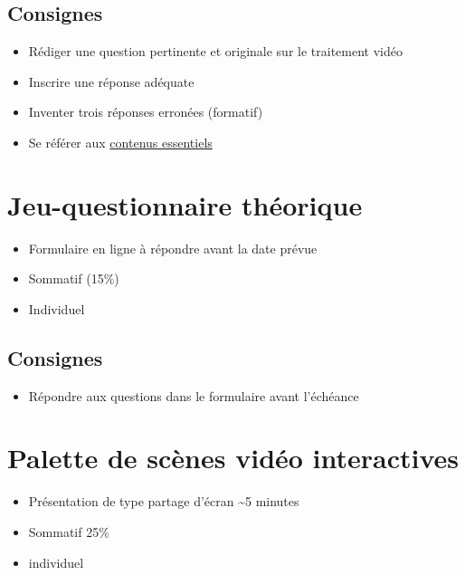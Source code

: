 \documentclass[
  french,
]{book}
\providecommand{\tightlist}{%
  \setlength{\itemsep}{0pt}\setlength{\parskip}{0pt}}
\begin{document}
\hypertarget{consignes-1}{%
\subsection{Consignes}\label{consignes-1}}

\begin{itemize}
\tightlist
\item
  Rédiger une question pertinente et originale sur le traitement vidéo
\item
  Inscrire une réponse adéquate
\item
  Inventer trois réponses erronées (formatif)
\item
  Se référer aux \href{}{contenus essentiels}
\end{itemize}

\hypertarget{sommatif_3}{%
\section{Jeu-questionnaire théorique}\label{sommatif_3}}

\begin{itemize}
\tightlist
\item
  Formulaire en ligne à répondre avant la date prévue
\item
  Sommatif (15\%)
\item
  Individuel
\end{itemize}

\hypertarget{consignes-2}{%
\subsection{Consignes}\label{consignes-2}}

\begin{itemize}
\tightlist
\item
  Répondre aux questions dans le formulaire avant l'échéance
\end{itemize}

\hypertarget{sommatif_4}{%
\section{Palette de scènes vidéo interactives}\label{sommatif_4}}

\begin{itemize}
\tightlist
\item
  Présentation de type partage d'écran \textasciitilde5 minutes
\item
  Sommatif 25\%
\item
  individuel
\end{itemize}
\end{document}
